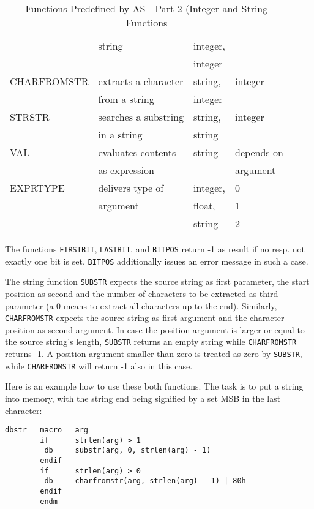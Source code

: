 \documentclass[12pt,twoside]{report}
\newcommand{\tty}[1]{{\tt #1}}
\begin{document}
\begin{table*}[htbp]
\begin{center}
\begin{tabular}{|l|l|l|l|}
            & string               & integer,             & \\
            &                      & integer              & \\
CHARFROMSTR & extracts a character & string,              & integer \\
            & from a string        & integer              & \\
STRSTR      & searches a substring & string,              & integer \\
            & in a string          & string               & \\
VAL         & evaluates contents   & string               & depends on \\
            & as expression        &                      & argument \\
EXPRTYPE    & delivers type of     & integer,             & 0 \\
            & argument             & float,               & 1 \\
            &                      & string               & 2 \\
\hline
\end{tabular}\end{center}
\caption{Functions Predefined by AS - Part 2 (Integer and
         String Functions \label{TabFuncs2}}
\end{table*}
The functions \tty{FIRSTBIT}, \tty{LASTBIT}, and \tty{BITPOS} return -1 as
result if no resp. not exactly one bit is set.  \tty{BITPOS} additionally
issues an error message in such a case.

The string function \tty{SUBSTR} expects the source string as first
parameter, the start position as second and the number of characters to be
extracted as third parameter (a 0 means to extract all characters up to
the end).  Similarly, \tty{CHARFROMSTR} expects the source string as
first argument and the character position as second argument.  In case the
position argument is larger or equal to the source string's length,
\tty{SUBSTR} returns an empty string while \tty{CHARFROMSTR} returns -1.
A position argument smaller than zero is treated as zero by \tty{SUBSTR},
while \tty{CHARFROMSTR} will return -1 also in this case.

Here is an example how to use these both functions.  The task is to put a
string into memory, with the string end being signified by a set MSB in
the last character:

\begin{verbatim}
dbstr   macro   arg
        if      strlen(arg) > 1
         db     substr(arg, 0, strlen(arg) - 1)
        endif
        if      strlen(arg) > 0
         db     charfromstr(arg, strlen(arg) - 1) | 80h
        endif
        endm
\end{verbatim}
\end{document}
